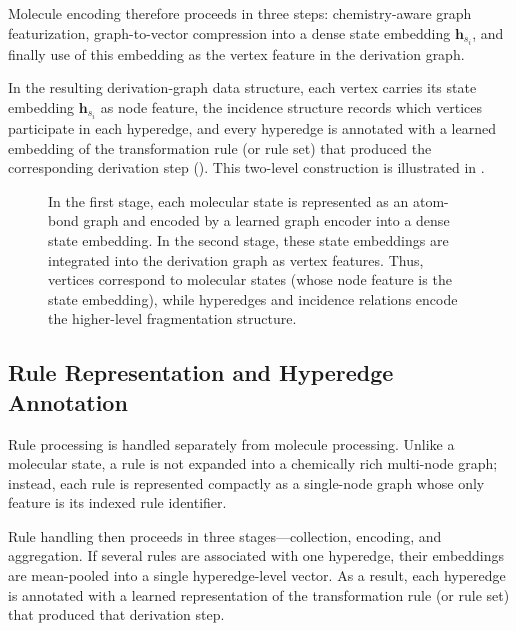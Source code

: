 Molecule encoding therefore proceeds in three steps:
chemistry-aware graph featurization,
graph-to-vector compression into a dense state embedding $\mathbf{h}_{s_i}$,
and finally use of this embedding as the vertex feature in the derivation graph.

In the resulting derivation-graph data structure, each vertex carries its state embedding $\mathbf{h}_{s_i}$ as node feature, the incidence structure records which vertices participate in each hyperedge, and every hyperedge is annotated with a learned embedding of the transformation rule (or rule set) that produced the corresponding derivation step (). This two-level construction is illustrated in .

\begin{figure}[H]
    \centering
    \resizebox{0.9\textwidth}{!}{
        
    }
    \caption[Two-Level Molecular Latent Representation]{
        In the first stage, each molecular state  is represented as an atom-bond graph and encoded by a learned graph encoder into a dense state embedding.
        In the second stage, these state embeddings are integrated into the derivation graph as vertex features.
        Thus, vertices correspond to molecular states (whose node feature is the state embedding), while hyperedges and incidence relations encode the higher-level fragmentation structure.
    }
    \label{fig:two_level_molecular_latent_representation}
\end{figure}

\subsection{Rule Representation and Hyperedge Annotation}
\label{sec:rule-representation}

Rule processing is handled separately from molecule processing.
Unlike a molecular state, a rule is not expanded into a chemically rich multi-node graph; instead, each rule is represented compactly as a single-node graph whose only feature is its indexed rule identifier.

Rule handling then proceeds in three stages---collection, encoding, and aggregation.
If several rules are associated with one hyperedge, their embeddings are mean-pooled into a single hyperedge-level vector.
As a result, each hyperedge is annotated with a learned representation of the transformation rule (or rule set) that produced that derivation step.

